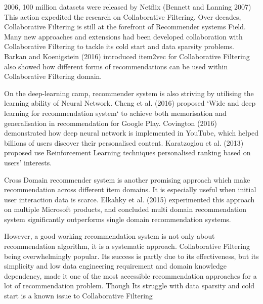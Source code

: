 \documentclass[12pt,a4 paper,title page]{article}
\begin{document}
2006, 100 million datasets were released by Netflix (Bennett and Lanning 2007) This action expedited the research on Collaborative Filtering. Over decades, Collaborative Filtering is still at the forefront of Recommender systems Field. Many new approaches and extensions had been developed collaboration with Collaborative Filtering to tackle its cold start and data sparsity problems. Barkan and Koenigstein (2016) introduced item2vec for Collaborative Filtering also showed how different forms of recommendations can be used within Collaborative Filtering domain. 

On the deep-learning camp, recommender system is also striving by utilising the learning ability of Neural Network. Cheng et al. (2016) proposed `Wide and deep learning for recommendation system` to achieve both memorisation and generalisation in recommendation for Google Play. Covington (2016) demonstrated how deep neural network is implemented in YouTube, which helped billions of users discover their personalised content. Karatzoglou et al. (2013) proposed use Reinforcement Learning techniques personalised ranking based on users’ interests.  

Cross Domain recommender system is another promising approach which make recommendation across different item domains. It is especially useful when initial user interaction data is scarce. Elkahky et al. (2015) experimented this approach on multiple Microsoft products, and concluded multi domain recommendation system significantly outperforms single domain recommendation systems. 

However, a good working recommendation system is not only about recommendation algorithm, it is a systematic approach.  Collaborative Filtering being overwhelmingly popular. Its success is partly due to its effectiveness, but its simplicity and low data engineering requirement and domain knowledge dependency, made it one of the most accessible recommendation approaches for a lot of recommendation problem. Though Its struggle with data sparsity and cold start is a known issue to Collaborative Filtering 
\end{document}
